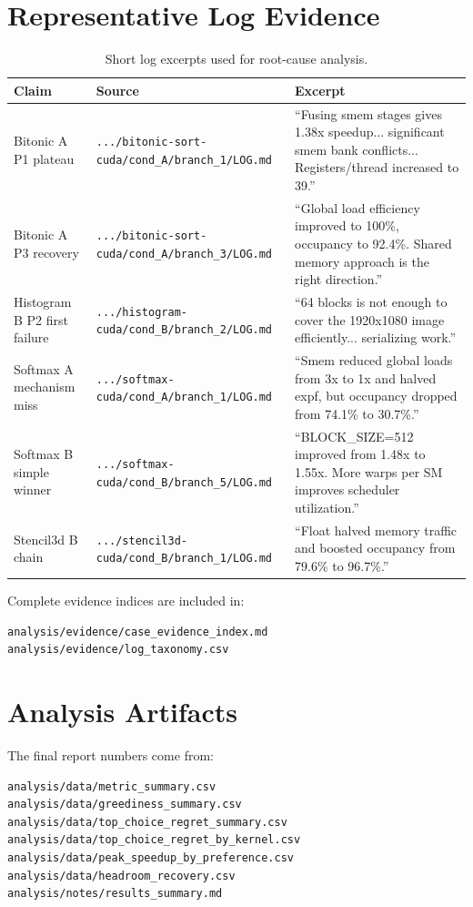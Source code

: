 \documentclass[conference]{IEEEtran}
\begin{document}
\section{Representative Log Evidence}
\FloatBarrier

\begin{table}[!htbp]
\centering
\caption{Short log excerpts used for root-cause analysis.}
\scriptsize
\begin{tabular}{p{}p{}p{}}
\toprule
\textbf{Claim} & \textbf{Source} & \textbf{Excerpt} \\
\midrule
Bitonic A P1 plateau &
\texttt{.../bitonic-sort-cuda/cond\_A/branch\_1/LOG.md} &
``Fusing smem stages gives 1.38x speedup... significant smem bank conflicts...
Registers/thread increased to 39.'' \\
Bitonic A P3 recovery &
\texttt{.../bitonic-sort-cuda/cond\_A/branch\_3/LOG.md} &
``Global load efficiency improved to 100\%, occupancy to 92.4\%. Shared memory
approach is the right direction.'' \\
Histogram B P2 first failure &
\texttt{.../histogram-cuda/cond\_B/branch\_2/LOG.md} &
``64 blocks is not enough to cover the 1920x1080 image efficiently...
serializing work.'' \\
Softmax A mechanism miss &
\texttt{.../softmax-cuda/cond\_A/branch\_1/LOG.md} &
``Smem reduced global loads from 3x to 1x and halved expf, but occupancy
dropped from 74.1\% to 30.7\%.'' \\
Softmax B simple winner &
\texttt{.../softmax-cuda/cond\_B/branch\_5/LOG.md} &
``BLOCK\_SIZE=512 improved from 1.48x to 1.55x. More warps per SM improves
scheduler utilization.'' \\
Stencil3d B chain &
\texttt{.../stencil3d-cuda/cond\_B/branch\_1/LOG.md} &
``Float halved memory traffic and boosted occupancy from 79.6\% to 96.7\%.'' \\
\bottomrule
\end{tabular}
\end{table}
\FloatBarrier

Complete evidence indices are included in:
\begin{lstlisting}
analysis/evidence/case_evidence_index.md
analysis/evidence/log_taxonomy.csv
\end{lstlisting}

\section{Analysis Artifacts}

The final report numbers come from:
\begin{lstlisting}
analysis/data/metric_summary.csv
analysis/data/greediness_summary.csv
analysis/data/top_choice_regret_summary.csv
analysis/data/top_choice_regret_by_kernel.csv
analysis/data/peak_speedup_by_preference.csv
analysis/data/headroom_recovery.csv
analysis/notes/results_summary.md
\end{lstlisting}
\end{document}
